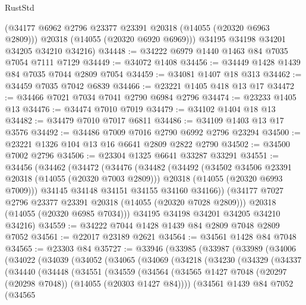 \begin{lexlean}{RustStd}
\begin{coremodule}
        (@34177 @6962 @2796 @23377 @23391 @20318 (@14055 (@20320 @6963 @2809)))
        @20318
        (@14055 (@20320 @6920 @6969)))
      @34195
      @34198
      @34201
      @34205
      @34210
      @34216)
@34448 := @34222 @6979 @1440 @1463 @84 @7035 @7054 @7111 @7129
@34449 := @34072 @1408
@34456 := @34449 @1428 @1439 @84 @7035 @7044 @2809 @7054
@34459 := @34081 @1407 @18 @313
@34462 := @34459 @7035 @7042 @6839
@34466 := @23221 @1405 @418 @13 @17
@34472 := @34466 @7021 @7034 @7041 @2790 @6984 @2796
@34474 := @23233 @1405 @13
@34476 := @34474 @7010 @7019
@34479 := @34102 @1404 @18 @13
@34482 := @34479 @7010 @7017 @6811
@34486 := @34109 @1403 @13 @17 @3576
@34492 := @34486 @7009 @7016 @2790 @6992 @2796 @23294
@34500 := @23221 @1326 @104 @13 @16 @6641 @2809 @2822 @2790
@34502 := @34500 @7002 @2796
@34506 := @23304 @1325 @6641 @33287 @33291
@34551 := @34456
    (@34462
      (@34472
        (@34476
          (@34482
            (@34492
              (@34502 @34506 @23391 @20318 (@14055 (@20320 @7003 @2809)))
              @20318
              (@14055 (@20320 @6993 @7009)))
            @34145
            @34148
            @34151
            @34155
            @34160
            @34166))
        (@34177 @7027 @2796 @23377 @23391 @20318 (@14055 (@20320 @7028 @2809)))
        @20318
        (@14055 (@20320 @6985 @7034)))
      @34195
      @34198
      @34201
      @34205
      @34210
      @34216)
@34559 := @34222 @7044 @1428 @1439 @84 @2809 @7048 @2809 @7052
@34561 := @22017 @23189 @2621
@34564 := @34561 @1428 @84 @7048
@34565 := @23303 @84
@35727 := @33946
    (@33985
      (@33987
        (@33989
          (@34006
            (@34022
              (@34039
                (@34052
                  (@34065
                    (@34069
                      (@34218
                        (@34230
                          (@34329
                            (@34337
                              (@34440
                                (@34448
                                  (@34551
                                    (@34559
                                      (@34564
                                        (@34565
                                          @1427
                                          @7048
                                          (@20297 (@20298 @7048))
                                          (@14055 (@20303 @1427 @84))))
                                      (@34561
                                        @1439
                                        @84
                                        @7052
                                        (@34565

\end{coremodule}
\end{lexlean}
